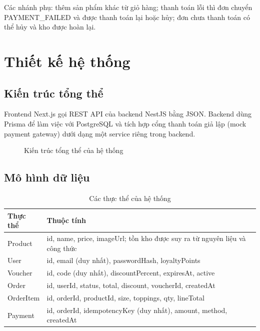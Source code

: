 \documentclass[a4paper]{article}
\begin{document}
Các nhánh phụ: thêm sản phẩm khác từ giỏ hàng; thanh toán lỗi thì đơn chuyển PAYMENT\_FAILED và được thanh toán lại hoặc hủy; đơn chưa thanh toán có thể hủy và kho được hoàn lại.

\newpage


\section{Thiết kế hệ thống}
\subsection{Kiến trúc tổng thể}
Frontend Next.js gọi REST API của backend NestJS bằng JSON. Backend dùng Prisma để làm việc với PostgreSQL và tích hợp cổng thanh toán giả lập (mock payment gateway) dưới dạng một service riêng trong backend.

\begin{figure}[h!]
\centering
{}
\caption{Kiến trúc tổng thể của hệ thống}
\end{figure}

\subsection{Mô hình dữ liệu}
\begin{table}[h!]
\centering
\footnotesize
\begin{tabularx}{\textwidth}{|l|X|}
\hline
\textbf{Thực thể} & \textbf{Thuộc tính} \\ \hline
Product & id, name, price, imageUrl; tồn kho được suy ra từ nguyên liệu và công thức \\ \hline
User & id, email (duy nhất), passwordHash, loyaltyPoints \\ \hline
Voucher & id, code (duy nhất), discountPercent, expiresAt, active \\ \hline
Order & id, userId, status, total, discount, voucherId, createdAt \\ \hline
OrderItem & id, orderId, productId, size, toppings, qty, lineTotal \\ \hline
Payment & id, orderId, idempotencyKey (duy nhất), amount, method, createdAt \\ \hline
\end{tabularx}
\caption{Các thực thể của hệ thống}
\end{table}
\end{document}
